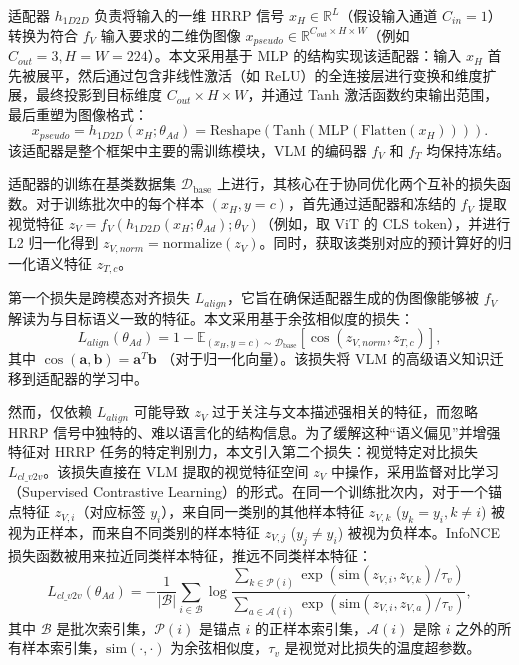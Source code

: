 适配器 $h_{1D2D}$ 负责将输入的一维 HRRP 信号 $x_H \in \mathbb{R}^{L}$（假设输入通道 $C_{in}=1$）转换为符合 $f_V$ 输入要求的二维伪图像 $x_{pseudo} \in \mathbb{R}^{C_{out} \times H \times W}$（例如 $C_{out}=3, H=W=224$）。本文采用基于 MLP 的结构实现该适配器：输入 $x_H$ 首先被展平，然后通过包含非线性激活（如 ReLU）的全连接层进行变换和维度扩展，最终投影到目标维度 $C_{out} \times H \times W$，并通过 Tanh 激活函数约束输出范围，最后重塑为图像格式： 
\begin{equation} x_{pseudo} = h_{1D2D}(x_H; \theta_{Ad}) = \text{Reshape}(\text{Tanh}(\text{MLP}(\text{Flatten}(x_H)))). \label{eq:adapter_1d2d} \end{equation} 
该适配器是整个框架中主要的需训练模块，VLM 的编码器 $f_V$ 和 $f_T$ 均保持冻结。 

适配器的训练在基类数据集 $\mathcal{D}_{\text{base}}$ 上进行，其核心在于协同优化两个互补的损失函数。对于训练批次中的每个样本 $(x_H, y=c)$，首先通过适配器和冻结的 $f_V$ 提取视觉特征 $z_V = f_V(h_{1D2D}(x_H; \theta_{Ad}); \theta_V)$（例如，取 ViT 的 CLS token），并进行 L2 归一化得到 $z_{V, norm} = \text{normalize}(z_V)$。同时，获取该类别对应的预计算好的归一化语义特征 $z_{T,c}$。 

第一个损失是跨模态对齐损失 $L_{align}$，它旨在确保适配器生成的伪图像能够被 $f_V$ 解读为与目标语义一致的特征。本文采用基于余弦相似度的损失： \begin{equation} L_{align}(\theta_{Ad}) = 1 - \mathbb{E}_{(x_H, y=c) \sim \mathcal{D}_{\text{base}}} \left[ \cos(z_{V, norm}, z_{T,c}) \right], \label{eq:adapter_align_loss_detail} \end{equation} 其中 $\cos(\mathbf{a}, \mathbf{b}) = \mathbf{a}^T \mathbf{b}$ （对于归一化向量）。该损失将 VLM 的高级语义知识迁移到适配器的学习中。 

然而，仅依赖 $L_{align}$ 可能导致 $z_V$ 过于关注与文本描述强相关的特征，而忽略 HRRP 信号中独特的、难以语言化的结构信息。为了缓解这种“语义偏见”并增强特征对 HRRP 任务的特定判别力，本文引入第二个损失：视觉特定对比损失 $L_{cl\_v2v}$。该损失直接在 VLM 提取的视觉特征空间 $z_V$ 中操作，采用监督对比学习（Supervised Contrastive Learning）的形式。在同一个训练批次内，对于一个锚点特征 $z_{V,i}$（对应标签 $y_i$），来自同一类别的其他样本特征 $z_{V,k}$ ($y_k=y_i, k \neq i$) 被视为正样本，而来自不同类别的样本特征 $z_{V,j}$ ($y_j \neq y_i$) 被视为负样本。InfoNCE 损失函数被用来拉近同类样本特征，推远不同类样本特征： 
\begin{equation} L_{cl\_v2v}(\theta_{Ad}) = -\frac{1}{|\mathcal{B}|}\sum_{i \in \mathcal{B}} \log \frac{\sum_{k \in \mathcal{P}(i)} \exp(\text{sim}(z_{V,i}, z_{V,k}) / \tau_v)}{\sum_{a \in \mathcal{A}(i)} \exp(\text{sim}(z_{V,i}, z_{V,a}) / \tau_v)}, \label{eq:adapter_contrastive_loss} \end{equation} 
其中 $\mathcal{B}$ 是批次索引集，$\mathcal{P}(i)$ 是锚点 $i$ 的正样本索引集，$\mathcal{A}(i)$ 是除 $i$ 之外的所有样本索引集，$\text{sim}(\cdot, \cdot)$ 为余弦相似度，$\tau_v$ 是视觉对比损失的温度超参数。 

